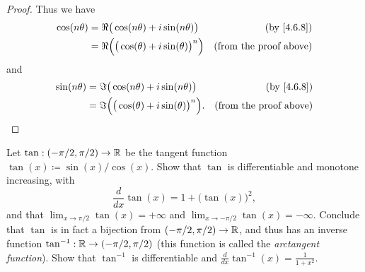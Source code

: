 \begin{proof}
  Thus we have
  \begin{align*}
    \cos(n \theta) & = \Re\big(\cos(n \theta) + i \sin(n \theta)\big)         & \text{(by \cref{4.6.8})}      \\
                   & = \Re\Big(\big(\cos(\theta) + i \sin(\theta)\big)^n\Big) & \text{(from the proof above)}
  \end{align*}
  and
  \begin{align*}
    \sin(n \theta) & = \Im\big(\cos(n \theta) + i \sin(n \theta)\big)          & \text{(by \cref{4.6.8})}      \\
                   & = \Im\Big(\big(\cos(\theta) + i \sin(\theta)\big)^n\Big). & \text{(from the proof above)}
  \end{align*}
\end{proof}

\begin{ex}\label{ex:4.7.8}
  Let \(\tan : (- \pi / 2, \pi / 2) \to \mathbb{R}\) be the tangent function \(\tan(x) \coloneqq \sin(x) / \cos(x)\).
  Show that \(\tan\) is differentiable and monotone increasing, with
  \[
    \frac{d}{dx} \tan(x) = 1 + \big(\tan(x)\big)^2,
  \]
  and that \(\lim_{x \to \pi / 2} \tan(x) = +\infty\) and \(\lim_{x \to -\pi / 2} \tan(x) = -\infty\).
  Conclude that \(\tan\) is in fact a bijection from \((- \pi / 2, \pi / 2) \to \mathbb{R}\), and thus has an inverse function \(\tan^{-1} : \mathbb{R} \to (- \pi / 2, \pi / 2)\)
  (this function is called the \emph{arctangent function}).
  Show that \(\tan^{-1}\) is differentiable and \(\frac{d}{dx} \tan^{-1}(x) = \frac{1}{1 + x^2}\).
\end{ex}

